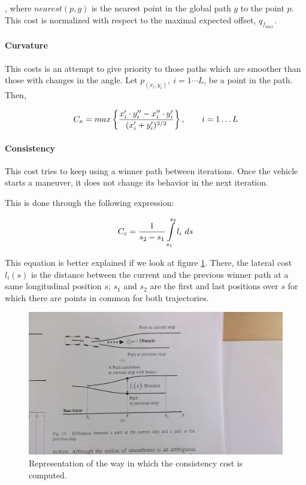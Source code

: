 , where $nearest(p, g)$ is the nearest point in the global path $g$ to the point $p$. This cost is normalized with respect to the maximal expected offset, $q_{f_{max}}$.

\paragraph{Curvature}\label{ch:chapter07_01_04_00_04}

This costs is an attempt to give priority to those paths which are smoother than those with changes in the angle. Let $p_(x_i, y_i), ~ i=1\cdots L$, be a point in the path. Then, 

\begin{equation}\label{eq:cp07_curvature_cost}
C_{\kappa} = max \left \{ {{x_i' \cdot y_i'' - x_i'' \cdot y_i'} \over {(x_i' + y_i')^{3/2}}} \right \}, ~~~~~~ i=1 \dots L
\end{equation}

\paragraph{Consistency}\label{ch:chapter07_01_04_00_05}

This cost tries to keep using a winner path between iterations. Once the vehicle starts a maneuver, it does not change its behavior in the next iteration.

This is done through the following expression:

\begin{equation}\label{eq:cp07_consistency_cost}
C_c = {1 \over {s_2 - s_1}} \int \limits_{s_1}^{s_2} l_i ~ ds
\end{equation}

This equation is better explained if we look at figure \ref{fig:cp07_consistency_cost}. There, the lateral cost $l_i(s)$ is the distance between the current and the previous winner path at a same longitudinal position $s$; $s_1$ and $s_2$ are the first and last positions over $s$ for which there are points in common for both trajectories.

\begin{figure}[h!]
  \centering
  \includegraphics[width=\textwidth]{consistency_cost}
  \caption{Representation of the way in which the consistency cost is computed.}\label{fig:cp07_consistency_cost}
\end{figure}

